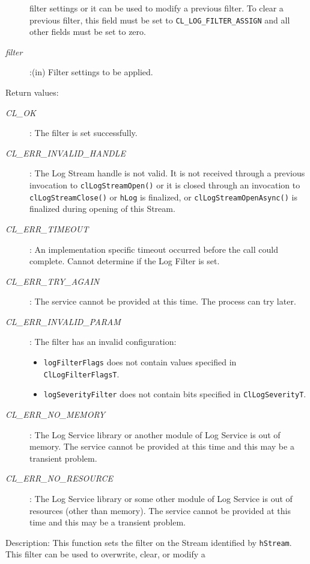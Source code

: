 \begin{flushleft}
\begin{Desc}
\begin{description}
filter settings or it can be used to modify a previous filter. To clear a previous filter, this field must be set to 
{\tt{CL\_\-LOG\_\-FILTER\_\-ASSIGN}} and all other fields must be set to zero.
\item[{\em filter}]:(in) Filter settings to be applied.
\end{description}
\end{Desc}
\begin{Desc}
\item[Return values:]
\begin{description}
\item[{\em CL\_\-OK}]: The filter is set successfully.
\item[{\em CL\_\-ERR\_\-INVALID\_\-HANDLE}]: The Log Stream handle is not valid. It is not received through a previous invocation to 
{\tt{clLogStreamOpen()}} or it is closed through an invocation to {\tt{clLogStreamClose()}} or {\tt{hLog}} is finalized, or 
{\tt{clLogStreamOpenAsync()}} is finalized during opening of this Stream.
\item[{\em CL\_\-ERR\_\-TIMEOUT}]: An implementation specific timeout occurred before the call could complete. Cannot determine if
the Log Filter is set.
\item[{\em CL\_\-ERR\_\-TRY\_\-AGAIN}]: The service cannot be provided at this time. The process can try later.
\item[{\em CL\_\-ERR\_\-INVALID\_\-PARAM}]: The filter has an invalid configuration:
	\begin{itemize}
	\item
	{\tt{logFilterFlags}} does not contain values specified in {\tt{ClLogFilterFlagsT}}.
	\item
	{\tt{logSeverityFilter}} does not contain bits specified in {\tt{ClLogSeverityT}}.
	\end{itemize}
\item[{\em CL\_\-ERR\_\-NO\_\-MEMORY}]: The Log Service library or another module of Log Service is out of memory. The service cannot 
be provided at this time and this may be a transient problem.
\item[{\em CL\_\-ERR\_\-NO\_\-RESOURCE}]: The Log Service library or some other module of Log Service is out of resources 
(other than memory). The service cannot be provided at this time and this may be a transient problem.
\end{description}
\end{Desc}
\begin{Desc}
\item[Description:] This function sets the filter on the Stream identified by {\tt{hStream}}. This filter can be used to overwrite, clear, or modify a

\end{Desc}
\end{flushleft}
